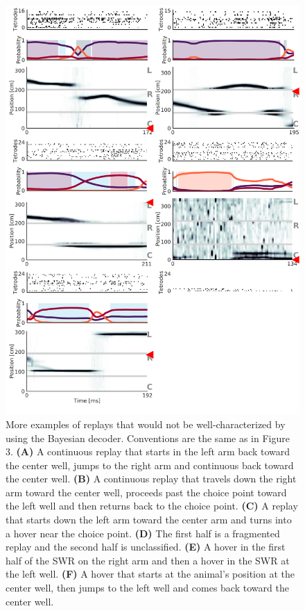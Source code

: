 \documentclass[times, twoside]{zHenriquesLab-StyleBioRxiv}
\begin{document}
\begin{figure}%
\centering
\includegraphics[width=0.80\linewidth]{figures/Figure3-supplemental1/Figure3_v2_supplemental1}
\caption{More examples of replays that would not be well-characterized by using the Bayesian decoder. Conventions are the same as in Figure 3. \textbf{(A)} A continuous replay that starts in the left arm back toward the center well, jumps to the right arm and continuous back toward the center well. \textbf{(B)} A continuous replay that travels down the right arm toward the center well, proceeds past the choice point toward the left well and then returns back to the choice point. \textbf{(C)} A replay that starts down the left arm toward the center arm and turns into a hover near the choice point. \textbf{(D)} The first half is a fragmented replay and the second half is unclassified. \textbf{(E)} A hover in the first half of the SWR on the right arm and then a hover in the SWR at the left well. \textbf{(F)} A hover that starts at the animal's position at the center well, then jumps to the left well and comes back toward the center well.
}
\label{fig:Figure3-Figure supplement 1}
\end{figure}


\end{document}
